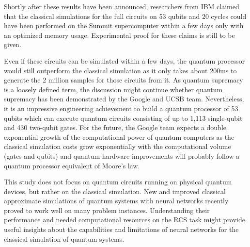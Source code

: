 Shortly after these results have been announced, researchers from IBM claimed that the classical simulations
for the full circuits on 53 qubits and 20 cycles could have been performed
on the Summit supercomputer within a few days only with an optimized memory
usage. Experimental proof for these claims is still to be given.

Even if these circuits can be simulated within a few days, the quantum
processor would still outperform the classical simulation as it only
takes about 200ms to generate the 2 million samples for those circuits from it. As quantum
supremacy is a loosely defined term, the discussion might continue whether
quantum supremacy has been demonstrated by the Google and UCSB team. Nevertheless, it is
an impressive engineering achievement to build a quantum processor of 53 qubits
which can execute quantum circuits consisting of up to 1,113 single-qubit and
430 two-qubit gates. For the future, the Google team expects a double exponential growth of the computational
power of quantum computers as the classical simulation costs grow exponentially
with the computational volume (gates and qubits) and quantum hardware
improvements will probably follow a quantum processor equivalent of Moore's law.

This study does not focus on quantum circuits running on physical quantum devices,
but rather on the classical simulation. New and improved classical
approximate simulations of quantum systems with neural networks recently proved
to work well on many problem instances. 
Understanding their performance and needed computational resources on
the RCS task might provide useful insights about the capabilities and
limitations of neural networks for the classical simulation of quantum systems.